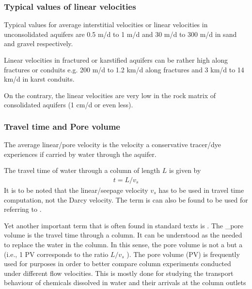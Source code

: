 \documentclass[letterpaper,10pt,english]{sphinxmanual}
\begin{document}
\subsubsection{Typical values of linear velocities}
\label{\detokenize{contents/flow/lecture_04/14_darcy_law_K:typical-values-of-linear-velocities}}
Typical values for average interstitial velocities or linear velocities in unconsolidated aquifers are 0.5 m/d to 1 m/d and 30
m/d to 300 m/d in sand and gravel respectively.

Linear velocities in fractured or
karstified aquifers can be rather high along fractures or conduits e.g. 200 m/d to 1.2
km/d along fractures and 3 km/d to 14 km/d in karst conduits.

On the contrary, the
linear velocities are very low in the rock matrix of consolidated aquifers (1 cm/d or
even less).


\subsubsection{Travel time and Pore volume}
\label{\detokenize{contents/flow/lecture_04/14_darcy_law_K:travel-time-and-pore-volume}}
The average linear/pore velocity is the velocity a conservative tracer/dye experiences if
carried by water through the aquifer.

The travel time of water through a column of
length \(L\) is given by
\begin{equation*}
\begin{split}
t = L/v_s
\end{split}
\end{equation*}
It is to be noted that the linear/seepage velocity \(v_s\) has to be used in travel time computation, not the Darcy velocity. The term  is can also be found to be used for referring to  .

Yet another important term that is often found in standard texts is . The \_pore volume is the travel time through a column. It can be understood as the  needed to replace the water in the column. In this sense, the pore volume is not a  but a  (i.e., 1 PV corresponds to the ratio \(L/v_s\) ). The pore volume (PV) is frequently used for  purposes in order to better compare column
experiments conducted under different flow velocities. This is mostly done for studying the transport behaviour of chemicals dissolved in water and their arrivals at the column outlets
\end{document}

